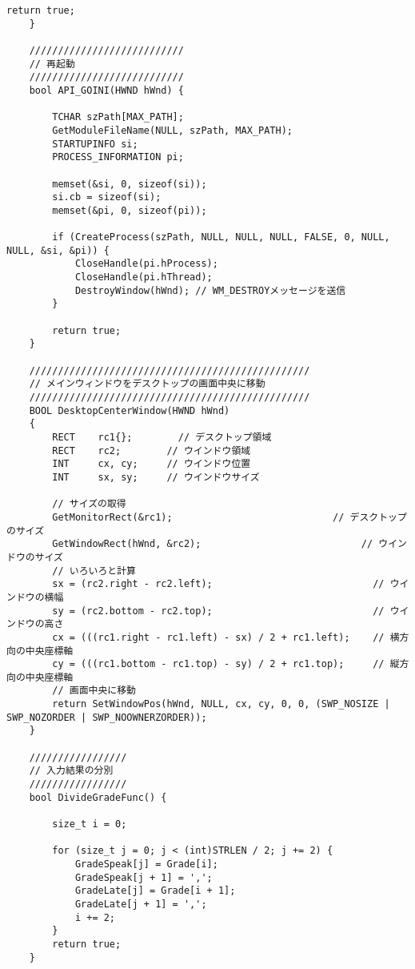 \begin{lstlisting}[caption=main.cpp]
		return true;
	}
	
	///////////////////////////
	// 再起動
	///////////////////////////
	bool API_GOINI(HWND hWnd) {
	
		TCHAR szPath[MAX_PATH];
		GetModuleFileName(NULL, szPath, MAX_PATH);
		STARTUPINFO si;
		PROCESS_INFORMATION pi;
	
		memset(&si, 0, sizeof(si));
		si.cb = sizeof(si);
		memset(&pi, 0, sizeof(pi));
	
		if (CreateProcess(szPath, NULL, NULL, NULL, FALSE, 0, NULL, NULL, &si, &pi)) {
			CloseHandle(pi.hProcess);
			CloseHandle(pi.hThread);
			DestroyWindow(hWnd); // WM_DESTROYメッセージを送信
		}
	
		return true;
	}
	
	/////////////////////////////////////////////////
	// メインウィンドウをデスクトップの画面中央に移動
	/////////////////////////////////////////////////
	BOOL DesktopCenterWindow(HWND hWnd)
	{
		RECT    rc1{};        // デスクトップ領域
		RECT    rc2;        // ウインドウ領域
		INT     cx, cy;     // ウインドウ位置
		INT     sx, sy;     // ウインドウサイズ
	
		// サイズの取得
		GetMonitorRect(&rc1);                            // デスクトップのサイズ
		GetWindowRect(hWnd, &rc2);                            // ウインドウのサイズ
		// いろいろと計算
		sx = (rc2.right - rc2.left);                            // ウインドウの横幅
		sy = (rc2.bottom - rc2.top);                            // ウインドウの高さ
		cx = (((rc1.right - rc1.left) - sx) / 2 + rc1.left);    // 横方向の中央座標軸
		cy = (((rc1.bottom - rc1.top) - sy) / 2 + rc1.top);     // 縦方向の中央座標軸
		// 画面中央に移動
		return SetWindowPos(hWnd, NULL, cx, cy, 0, 0, (SWP_NOSIZE | SWP_NOZORDER | SWP_NOOWNERZORDER));
	}
	
	/////////////////
	// 入力結果の分別
	/////////////////
	bool DivideGradeFunc() {
	
		size_t i = 0;
	
		for (size_t j = 0; j < (int)STRLEN / 2; j += 2) {
			GradeSpeak[j] = Grade[i];
			GradeSpeak[j + 1] = ',';
			GradeLate[j] = Grade[i + 1];
			GradeLate[j + 1] = ',';
			i += 2;
		}
		return true;
	}
	
\end{lstlisting}
